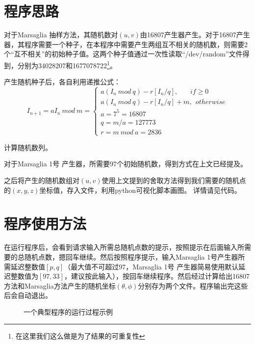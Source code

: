 \documentclass[a4paper,11pt]{article}
\begin{document}
\section{程序思路}
对于Marsaglia 抽样方法，其随机数对$(u,v)$由16807产生器产生。对于16807产生器，其程序需要一个种子，在本程序中需要产生两组互不相关的随机数，则需要2个“互不相关”的初始种子值。这两个种子值通过一次性读取“/dev/random”文件得到，分别为34028207和1677078722\footnote{在这里我们这么做是为了结果的可重复性}。

产生随机种子后，各自利用递推公式：
\begin{equation}
	I_{n+1} = aI_{n}  \ mod \ m = \left\{
	\begin{array}{l}
	a(I_{n}\ mod \ q) - r[I_{n}/q],\ \ \ \ \ \ \ \ if \geq 0 \\
		a(I_{n}\ mod \ q) - r[I_{n}/q] + m,\ \ otherwise	 \\
		a= 7^{5} =16807 \\
		q=m/a=127773\\
		r=m \ mod \ a=2836
	\end{array} 
	\right.
\end{equation}

计算随机数列。

对于Marsaglia 1号 产生器，所需要97个初始随机数，得到方式在上文已经提及。

之后将产生的随机数组对$(u,v)$使用上文提到的舍取方法得到我们需要的随机点的$(x,y,z)$坐标值，存入文件，利用python可视化脚本画图。
详情请见代码。

\section{程序使用方法}
在运行程序后，会看到请求输入所需总随机点数的提示，按照提示在后面输入所需要的总随机点数，摁回车继续。然后按照程序提示，输入Marsaglia 1号产生器所需延迟整数值$[p,q]$（最大值不可超过97，Marsaglia 1号 产生器简易使用默认延迟整数值为$[97,33]$，建议按此输入），按回车继续程序。然后经过计算给出16807方法和Marsaglia方法产生的随机坐标$(\theta,\phi)$分别存为两个文件。程序输出完这些后会自动退出。
\begin{figure}[!htbp]        
\caption{\label{1} 一个典型程序的运行过程示例}      
\end{figure}
\end{document}
